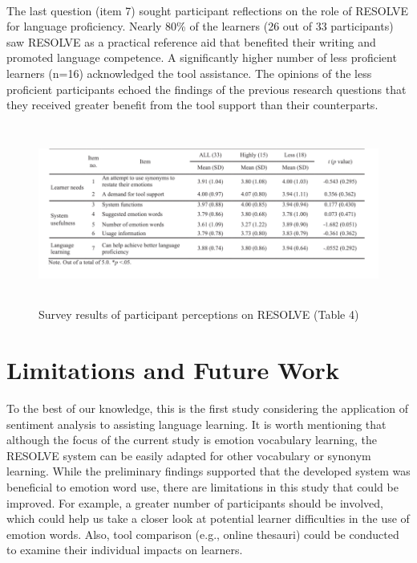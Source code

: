 \documentclass[a4paper,12pt,oneside]{article}
\let\counterwithin\relax
\begin{document}
\paragraph{}
The last question (item 7) sought participant reflections on the role of RESOLVE for language proficiency. Nearly 80\% of the learners (26 out of 33 participants) saw RESOLVE as a practical reference aid that benefited their writing and promoted language competence. A significantly higher number of less proficient learners (n=16) acknowledged the tool assistance. The opinions of the less proficient participants echoed the findings of the previous research questions that they received greater benefit from the tool support than their counterparts. 

\begin{figure}[H]
\includegraphics[height=5.9cm,width=15.4cm]{Table4.png}
\centering
\caption{Survey results of participant perceptions on RESOLVE (Table 4)}
\end{figure}

\newpage
\section{Limitations and Future Work}
To the best of our knowledge, this is the first study considering the application of sentiment analysis to assisting language learning. It is worth mentioning that although the focus of the current study is emotion vocabulary learning, the RESOLVE system can be easily adapted for other vocabulary or synonym learning. While the preliminary findings supported that the developed system was beneficial to emotion word use, there are limitations in this study that could be improved. For example, a greater number of participants should be involved, which could help us take a closer look at potential learner difficulties in the use of emotion words. Also, tool comparison (e.g., online thesauri) could be conducted to examine their individual impacts on learners. 
\end{document}
